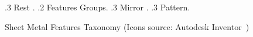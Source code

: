 \begin{center}
\begin{figure} [!h]
{.3 Rest \qquad {}.
.2 Features Groups.
.3 Mirror \quad  \quad {}.
.3 Pattern\quad  {}.
}
\caption{Sheet Metal Features Taxonomy (Icons source: Autodesk Inventor~\cite{Inventor2014Help})}\label{fig:defeaturing:tax_sm}
\end{figure}
\end{center}


